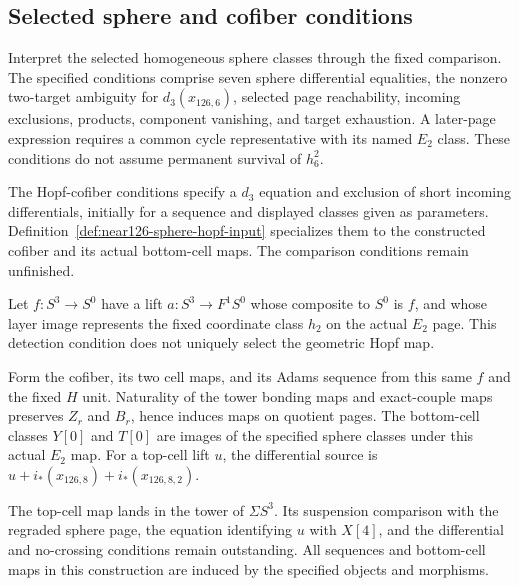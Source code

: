 \subsection{Selected sphere and cofiber conditions}

\begin{definition}
  \label{def:near126-fixed-sphere-facts}
  \notready
  Interpret the selected homogeneous sphere classes through the fixed
  comparison. The specified conditions comprise seven sphere differential
  equalities, the nonzero two-target ambiguity for $d_3(x_{126,6})$,
  selected page reachability, incoming exclusions, products, component
  vanishing, and target exhaustion. A later-page expression requires a
  common cycle representative with its named $E_2$ class. These conditions
  do not assume permanent survival of $h_6^2$.

  The Hopf-cofiber conditions specify a $d_3$ equation and exclusion of
  short incoming differentials, initially for a sequence and displayed
  classes given as parameters. Definition~\ref{def:near126-sphere-hopf-input}
  specializes them to the constructed cofiber and its actual bottom-cell
  maps. The comparison conditions remain unfinished.
\end{definition}

\begin{definition}
  \label{def:near126-sphere-hopf-input}
  \notready
  Let $f:S^3\to S^0$ have a lift $a:S^3\to F^1S^0$ whose composite
  to $S^0$ is $f$, and whose layer image represents the fixed coordinate
  class $h_2$ on the actual $E_2$ page. This detection condition does
  not uniquely select the geometric Hopf map.

  Form the cofiber, its two cell maps, and its Adams sequence from
  this same $f$ and the fixed $H$ unit. Naturality of the tower bonding
  maps and exact-couple maps preserves $Z_r$ and $B_r$, hence induces
  maps on quotient pages. The bottom-cell classes $Y[0]$ and $T[0]$
  are images of the specified sphere classes under this actual $E_2$
  map. For a top-cell lift $u$, the differential source is
  $u+i_*(x_{126,8})+i_*(x_{126,8,2})$.

  The top-cell map lands in the tower of $\Sigma S^3$. Its suspension
  comparison with the regraded sphere page, the equation identifying
  $u$ with $X[4]$, and the differential and no-crossing conditions remain
  outstanding. All sequences and bottom-cell maps in this construction
  are induced by the specified objects and morphisms.
\end{definition}

